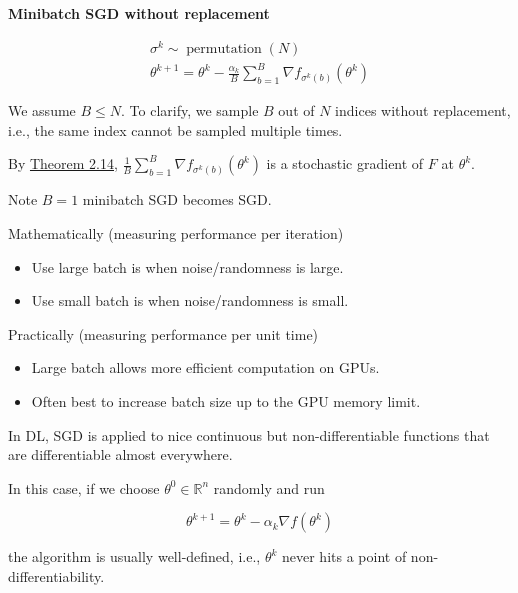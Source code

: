 \documentclass{report}
\begin{document}
\begin{definition}
    \textbf{Minibatch SGD without replacement}

    $$
    \begin{gathered}
    \sigma^{k} \sim \operatorname{permutation}(N) \\
    \theta^{k+1}=\theta^{k}-\frac{\alpha_{k}}{B} \sum_{b=1}^{B} \nabla f_{\sigma^{k}(b)}\left(\theta^{k}\right)
    \end{gathered}
    $$

    We assume $B \leq N$. To clarify, we sample $B$ out of $N$ indices without replacement, i.e., the same index cannot be sampled multiple times.

    By \hyperref[theorem:2.14]{Theorem 2.14}, $\frac{1}{B} \sum_{b=1}^{B} \nabla f_{\sigma^{k}(b)}\left(\theta^{k}\right)$ is a stochastic gradient of $F$ at $\theta^{k}$.
\end{definition}

\begin{concept}
    Note $B=1$ minibatch SGD becomes SGD.

    Mathematically (measuring performance per iteration)

    \begin{itemize}
        \item Use large batch is when noise/randomness is large.
        \item Use small batch is when noise/randomness is small.
    \end{itemize}

    Practically (measuring performance per unit time)

    \begin{itemize}
        \item Large batch allows more efficient computation on GPUs.
        \item Often best to increase batch size up to the GPU memory limit.
    \end{itemize}
\end{concept}

In DL, SGD is applied to nice continuous but non-differentiable functions that are differentiable almost everywhere.

In this case, if we choose $\theta^{0} \in \mathbb{R}^{n}$ randomly and run

$$
\theta^{k+1}=\theta^{k}-\alpha_{k} \nabla f\left(\theta^{k}\right)
$$

the algorithm is usually well-defined, i.e., $\theta^{k}$ never hits a point of non-differentiability.
\end{document}
